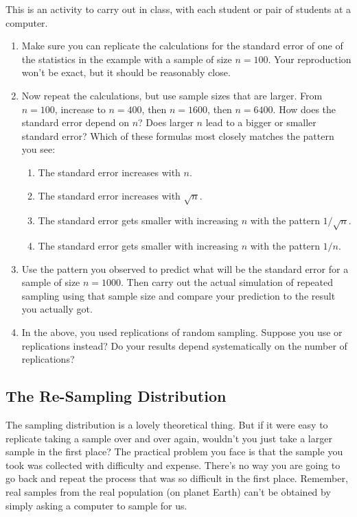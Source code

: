 \begin{example}
This is an activity to carry out in class, with each student or pair
of students at a computer.

\begin{enumerate}
  \item Make sure you can replicate the calculations for the standard
    error of one of the statistics in the  example with a
    sample of size $n=100$.  Your reproduction won't be exact, but it
    should be reasonably close.
  \item Now repeat the calculations, but use sample sizes that are
    larger.  From $n=100$, increase to $n=400$, then $n=1600$, then $n=6400$.
    How does the standard error depend on $n$?  Does larger $n$
    lead to a bigger or smaller standard error?  Which of these
    formulas most closely matches the pattern you see:
    \begin{enumerate}
      \item The standard error increases with $n$.
      \item The standard error increases with $\sqrt{n}$.
      \item The standard error gets smaller with increasing $n$ with
       the pattern $1/\sqrt{n}$.
      \item The standard error gets smaller with increasing $n$ with
       the pattern $1/n$.
   \end{enumerate}
    \item Use the pattern you observed to predict what will be the
      standard error for a sample of size $n=1000$.  Then carry out
      the actual simulation of repeated sampling using that sample size and compare your
      prediction to the result you actually got.
      
    \item In the above, you used  replications of
      random sampling.  Suppose you use  or
       replications instead?  Do your results depend
      systematically on the number of replications?
 
 \end{enumerate}
\end{example}


\subsection{The Re-Sampling Distribution}

The sampling distribution is a lovely theoretical thing.  But if it
were easy to replicate taking a sample over and over again,
wouldn't you just take a larger sample in the first place?  The
practical problem you face is that the sample you took was collected
with difficulty and expense.  There's no way you are going to go back
and repeat the process that was so difficult in the first place.
Remember, real samples from the real population (on planet Earth) 
can't be obtained by simply asking a computer to sample for us.

